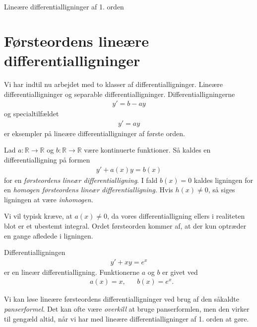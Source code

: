 \begin{center}
\Huge
Lineære differentialligninger af 1. orden
\end{center}
\section*{Førsteordens lineære differentialligninger}

Vi har indtil nu arbejdet med to klasser af differentialligninger. Lineære differentialligninger og separable differentialligninger. Differentialligningerne
\begin{align*}
	y' = b-ay
\end{align*}
og specialtilfældet
\begin{align*}
	y' = ay
\end{align*}
er eksempler på lineære differentialligninger af første orden. 
\begin{defn}
	Lad $a:\mathbb{R}\to \mathbb{R}$ og $b:\mathbb{R}\to \mathbb{R}$ være kontinuerte funktioner. Så kaldes en differentialligning
	på formen
	\begin{align*}
		y' + a(x)y = b(x)
	\end{align*}
	for en \textit{førsteordens lineær differentialligning}.
	I fald $b(x)=0$ kaldes ligningen for en \textit{homogen førsteordens lineær differentialligning.} Hvis $h(x) \neq 0$, så siges ligningen at være 
	\textit{inhomogen.}
\end{defn}

Vi vil typisk kræve, at $a(x)\neq 0$, da vores differentialligning ellers i realiteten blot er et ubestemt integral. 
Ordet førsteorden kommer af, at der kun optræder en gange afledede i ligningen. 

\begin{exa}
	Differentialligningen 
	\begin{align*}
		y' + xy = e^x
	\end{align*}
	er en lineær differentialligning. Funktionerne $a$ og $b$ er givet ved
	\begin{align*}
		&a(x) = x, &&b(x) = e^x.
	\end{align*}
\end{exa}

Vi kan løse lineære førsteordens differentialligninger ved brug af den såkaldte \textit{panserformel}. Det kan ofte være \textit{overkill} at bruge panserformlen, men 
den virker til gengæld altid, når vi har med lineære differentialligninger af 1. orden at gøre. 

